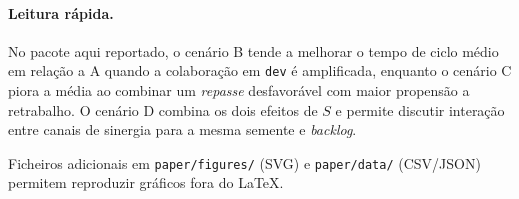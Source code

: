 \paragraph{Leitura rápida.}
No pacote aqui reportado, o cenário B tende a melhorar o tempo de ciclo médio em relação a A quando a colaboração em \texttt{dev} é amplificada, enquanto o cenário C piora a média ao combinar um \emph{repasse} desfavorável com maior propensão a retrabalho. O cenário D combina os dois efeitos de $S$ e permite discutir interação entre canais de sinergia para a mesma semente e \emph{backlog}.

Ficheiros adicionais em \texttt{paper/figures/} (SVG) e \texttt{paper/data/} (CSV/JSON) permitem reproduzir gráficos fora do \LaTeX{}.
